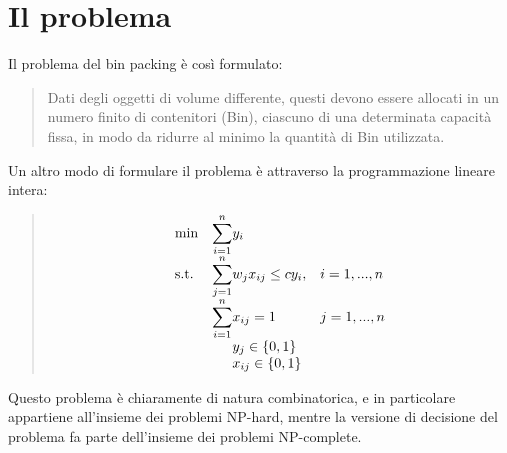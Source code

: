 \section{Il problema}
Il problema del bin packing è così formulato:
\begin{quote}
Dati degli oggetti di volume differente, questi devono essere allocati in un numero finito di contenitori (Bin), ciascuno di una determinata capacità fissa, in modo da ridurre al minimo la quantità di Bin utilizzata.
\end{quote}
Un altro modo di formulare il problema è attraverso la programmazione lineare intera:
\begin{quote}	
	\begin{equation*}
		\begin{array}{ll@{}ll}
			\text{min}  & \displaystyle\sum\limits_{i=1}^{n} & y_i \\
			\text{s.t.} & \displaystyle\sum\limits_{j=1}^{n} & w_j x_{ij} \leq c y_i,  & i=1 ,..., n\\
		                & \displaystyle\sum\limits_{i=1}^{n} & x_{ij} = 1 & j=1 ,..., n\\
		             	& 								     & y_{j} \in \{0,1\}\\
		                & 								     & x_{ij} \in \{0,1\}\\
		\end{array}
\end{equation*}
	
\end{quote}
Questo problema è chiaramente di natura combinatorica, e in particolare appartiene all'insieme dei problemi NP-hard, mentre la versione di decisione del problema fa parte dell'insieme dei problemi NP-complete.